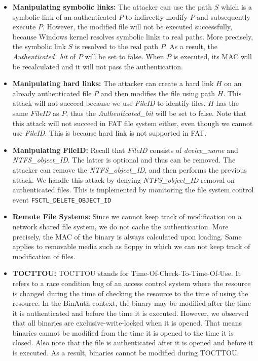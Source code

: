 \begin{itemize}
\item {\bf Manipulating symbolic links:}
The attacker can use the path $S$ which is a symbolic link of an authenticated $P$
to indirectly modify $P$ and subsequently execute $P$.
However, the modified file will not be executed successfully, because
Windows kernel resolves symbolic links to real paths.
More precisely, the symbolic link $S$ is resolved to the real path $P$.
As a result, the {\it Authenticated\_bit} of $P$ will be set to false.
When $P$ is executed, its MAC will be recalculated and it will not pass
the authentication.

\item {\bf Manipulating hard links:}
The attacker can create a hard link $H$ on an already authenticated file $P$
and then modifies the file using path $H$.
This attack will not succeed because we use {\it FileID} to identify files.
$H$ has the same {\it FileID} as $P$,
thus the {\it Authenticated\_bit} will be set to false.
Note that this attack will not succeed in FAT file system either,
even though we cannot use {\it FileID}.
This is because hard link is not supported in FAT.

\item {\bf Manipulating FileID:}
Recall that {\it FileID} consists of {\it device\linebreak[0]\_\linebreak[0]name}
and {\it NTFS\linebreak[0]\_\linebreak[0]object\linebreak[0]\_\linebreak[0]ID}.
The latter is optional and thus can be removed.
The attacker can remove the {\it NTFS\_object\_ID}, and then performs the previous attack.
We handle this attack by denying {\it NTFS\_object\_ID} removal on authenticated files.
This is implemented by monitoring the file system control event {\tt FSCTL\_DELETE\_OBJECT\_ID}

\item {\bf Remote File Systems:}
Since we cannot keep track of modification on a network shared file system,
we do not cache the authentication.
More precisely, the MAC of the binary is always calculated upon loading.
Same applies to removable media such as floppy in which we can not
keep track of modification of files.

\item {\bf TOCTTOU:}
TOCTTOU stands for Time-Of-Check-To-Time-Of-Use.
It refers to a race condition bug of an access control system
where the resource is changed during the time
of checking the resource to the time of using the resource.
In the BinAuth context, the binary may be modified
after the time it is authenticated and before the time it is executed.
However, we observed that all binaries are exclusive-write-locked
when it is opened.
That means binaries cannot be modified from the time it is opened
to the time it is closed.
Also note that the file is authenticated after it is opened and before
it is executed.
As a result, binaries cannot be modified during TOCTTOU.


\end{itemize}
